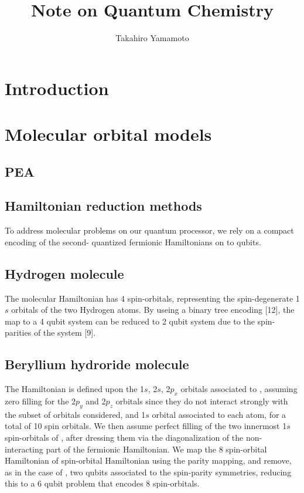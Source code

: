 \documentclass[11pt, oneside]{article}   	%
\title{Note on Quantum Chemistry}
\author{Takahiro Yamamoto}
\begin{document}
\maketitle
\section{Introduction}
\section{Molecular orbital models}
\subsection{PEA}
\subsection{Hamiltonian reduction methods}
To address molecular problems on our quantum processor, we rely on a compact encoding of the second- quantized fermionic Hamiltonians on to qubits. 

\subsection{Hydrogen molecule}
The  molecular Hamiltonian has 4 spin-orbitals, representing the spin-degenerate 1$s$ orbitals of the two Hydrogen atoms. 
By useing a binary tree encoding [12], the map to a 4 qubit system can be reduced to 2 qubit system due to the spin-parities of the system [9]. 

\subsection{Beryllium hydroride molecule}
The  Hamiltonian is defined upon the 1$s$, 2$s$, 2$p_x$ orbitals associated to , assuming zero filling for the 2$p_y$ and 2$p_z$ orbitals since they do not interact strongly with the subset of orbitals considered, and 1$s$ orbital associated to each  atom, for a total of 10 spin orbitals. 
We then assume perfect filling of the two innermost 1$s$ spin-orbitals of , after dressing them via the diagonalization of the non-interacting part of the fermionic Hamiltonian. 
We map the 8 spin-orbital Hamiltonian of  spin-orbital Hamiltonian using the parity mapping, and remove, as in the case of , two qubits associated to the spin-parity symmetries, 
reducing this to a 6 qubit problem that encodes 8 spin-orbitals. 
\end{document}
